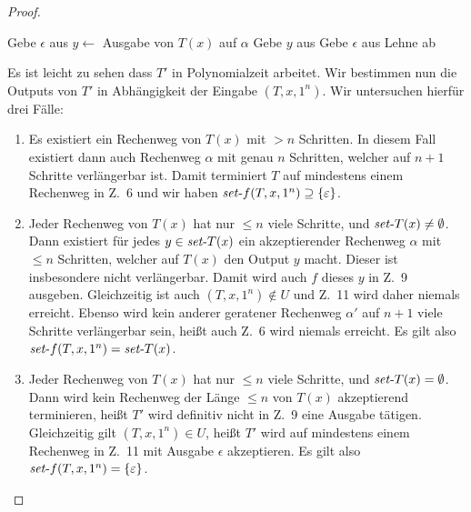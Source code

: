 \begin{proof}
    \begin{algorithm}[H]\setcounter{AlgoLine}{4}
        {
            Gebe $\epsilon$ aus\;
        }
        {
            $y\gets $ Ausgabe von $T(x)$ auf $\alpha$\;
            Gebe $y$ aus\;
        }
        {
            Gebe $\epsilon$ aus\;
        }
        \Else
        {
            Lehne ab\;
        }
    \end{algorithm}
    Es ist leicht zu sehen dass $T'$ in Polynomialzeit arbeitet. 
    Wir bestimmen nun die Outputs von $T'$  in Abhängigkeit der Eingabe $(T, x, 1^n)$.
    Wir untersuchen hierfür drei Fälle:
    \begin{enumerate}[label=\arabic*.]
        \item Es existiert ein Rechenweg von $T(x)$ mit $>n$ Schritten. In diesem Fall existiert dann auch Rechenweg $\alpha$ mit genau $n$ Schritten, welcher auf $n+1$ Schritte verlängerbar ist. Damit terminiert $T$ auf mindestens einem Rechenweg in Z.~6 und wir haben $\mathit{set}\text{-}{f}(T, x, 1^n)\supseteq\{\varepsilon\}$.
        \item Jeder Rechenweg von $T(x)$ hat nur $\leq n$ viele Schritte, und $\mathit{set}\text{-}{T}(x)\neq\emptyset$. Dann existiert für jedes $y\in \mathit{set}\text{-}{T}(x)$ ein akzeptierender Rechenweg $\alpha$ mit $\leq n$ Schritten, welcher auf $T(x)$ den Output $y$ macht. Dieser ist insbesondere nicht verlängerbar. Damit wird auch $f$ dieses $y$ in Z.~9 ausgeben.
            Gleichzeitig ist auch $(T, x, 1^n)\not\in U$ und Z.~11 wird daher niemals erreicht.
            Ebenso wird kein anderer geratener Rechenweg $\alpha'$ auf $n+1$ viele Schritte verlängerbar sein, heißt auch Z.~6 wird niemals erreicht.
            Es gilt also $\mathit{set}\text{-}{f}(T, x, 1^n)=\mathit{set}\text{-}{T}(x)$.
    \item Jeder Rechenweg von $T(x)$ hat nur $\leq n$ viele Schritte, und $\mathit{set}\text{-}{T}(x)=\emptyset$. 
        Dann wird kein Rechenweg der Länge $\leq n$ von $T(x)$ akzeptierend terminieren, heißt $T'$ wird definitiv nicht in Z.~9 eine Ausgabe tätigen.
        Gleichzeitig gilt $(T, x, 1^n)\in U$, heißt $T'$ wird auf mindestens einem Rechenweg in Z.~11 mit Ausgabe $\epsilon$ akzeptieren.
        Es gilt also $\mathit{set}\text{-}{f}(T, x, 1^n)=\{\varepsilon\}$.
    \end{enumerate}


\end{proof}
